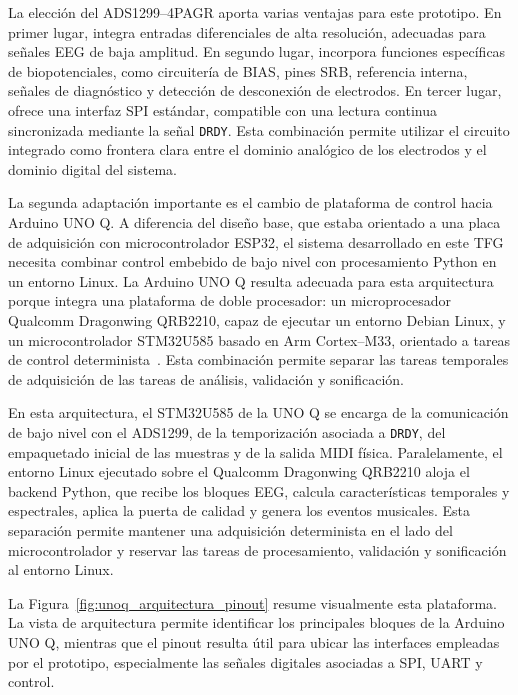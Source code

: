 La elección del ADS1299--4PAGR aporta varias ventajas para este prototipo. En primer lugar, integra entradas diferenciales de alta resolución, adecuadas para señales EEG de baja amplitud. En segundo lugar, incorpora funciones específicas de biopotenciales, como circuitería de BIAS, pines SRB, referencia interna, señales de diagnóstico y detección de desconexión de electrodos. En tercer lugar, ofrece una interfaz SPI estándar, compatible con una lectura continua sincronizada mediante la señal \texttt{DRDY}. Esta combinación permite utilizar el circuito integrado como frontera clara entre el dominio analógico de los electrodos y el dominio digital del sistema.

La segunda adaptación importante es el cambio de plataforma de control hacia Arduino UNO Q. A diferencia del diseño base, que estaba orientado a una placa de adquisición con microcontrolador ESP32, el sistema desarrollado en este TFG necesita combinar control embebido de bajo nivel con procesamiento Python en un entorno Linux. La Arduino UNO Q resulta adecuada para esta arquitectura porque integra una plataforma de doble procesador: un microprocesador Qualcomm Dragonwing QRB2210, capaz de ejecutar un entorno Debian Linux, y un microcontrolador STM32U585 basado en Arm Cortex--M33, orientado a tareas de control determinista~\cite{ArduinoUNOQHardware}. Esta combinación permite separar las tareas temporales de adquisición de las tareas de análisis, validación y sonificación.

En esta arquitectura, el STM32U585 de la UNO Q se encarga de la comunicación de bajo nivel con el ADS1299, de la temporización asociada a \texttt{DRDY}, del empaquetado inicial de las muestras y de la salida MIDI física. Paralelamente, el entorno Linux ejecutado sobre el Qualcomm Dragonwing QRB2210 aloja el backend Python, que recibe los bloques EEG, calcula características temporales y espectrales, aplica la puerta de calidad y genera los eventos musicales. Esta separación permite mantener una adquisición determinista en el lado del microcontrolador y reservar las tareas de procesamiento, validación y sonificación al entorno Linux.

La Figura~\ref{fig:unoq_arquitectura_pinout} resume visualmente esta plataforma. La vista de arquitectura permite identificar los principales bloques de la Arduino UNO Q, mientras que el pinout resulta útil para ubicar las interfaces empleadas por el prototipo, especialmente las señales digitales asociadas a SPI, UART y control.


